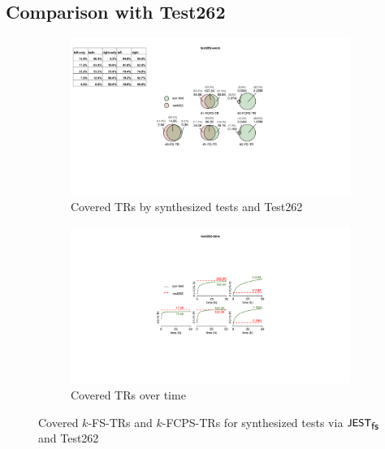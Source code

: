 \documentclass[acmsmall,review,screen]{acmart}
\newcommand{\name}[1]{\textsf{#1}}
\newcommand{\sname}[1]{\name{\small #1}}
\newcommand{\jest}{\sname{JEST}}
\newcommand{\tool}{\jest_{\sname{fs}}}
\begin{document}

\subsection{Comparison with Test262}\label{sec:compare-test262}

\begin{figure}
  \centering
%
  \begin{subfigure}{0.49\textwidth}
    \includegraphics[width=\textwidth]{img/test262-venn}
    \caption{Covered TRs by synthesized tests and Test262}
  \end{subfigure}
%
  \begin{subfigure}{0.49\textwidth}
    \includegraphics[width=\textwidth]{img/test262-time}
    \caption{Covered TRs over time}
  \end{subfigure}
%
  \caption{Covered $k$-FS-TRs and $k$-FCPS-TRs for synthesized tests via $\tool$ and Test262
  }
  \label{fig:test262}
\vspace*{-1em}
\end{figure}
\end{document}
